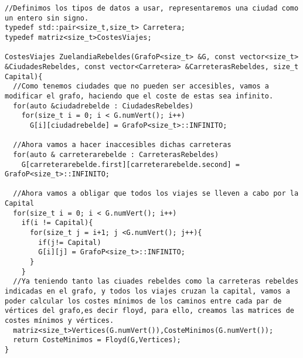 \newpage
\begin{verbatim}
//Definimos los tipos de datos a usar, representaremos una ciudad como un entero sin signo.
typedef std::pair<size_t,size_t> Carretera;
typedef matriz<size_t>CostesViajes;

CostesViajes ZuelandiaRebeldes(GrafoP<size_t> &G, const vector<size_t> &CiudadesRebeldes, const vector<Carretera> &CarreterasRebeldes, size_t Capital){
  //Como tenemos ciudades que no pueden ser accesibles, vamos a modificar el grafo, haciendo que el coste de estas sea infinito.
  for(auto &ciudadrebelde : CiudadesRebeldes)
    for(size_t i = 0; i < G.numVert(); i++)
      G[i][ciudadrebelde] = GrafoP<size_t>::INFINITO;

  //Ahora vamos a hacer inaccesibles dichas carreteras
  for(auto & carreterarebelde : CarreterasRebeldes)
    G[carreterarebelde.first][carreterarebelde.second] = GrafoP<size_t>::INFINITO;

  //Ahora vamos a obligar que todos los viajes se lleven a cabo por la Capital
  for(size_t i = 0; i < G.numVert(); i++)
    if(i != Capital){
      for(size_t j = i+1; j <G.numVert(); j++){
        if(j!= Capital)
        G[i][j] = GrafoP<size_t>::INFINITO;
      }
    }
  //Ya teniendo tanto las ciuades rebeldes como la carreteras rebeldes indicadas en el grafo, y todos los viajes cruzan la capital, vamos a poder calcular los costes mínimos de los caminos entre cada par de vértices del grafo,es decir floyd, para ello, creamos las matrices de costes mínimos y vértices.
  matriz<size_t>Vertices(G.numVert()),CosteMinimos(G.numVert());
  return CosteMinimos = Floyd(G,Vertices); 
}
\end{verbatim}


